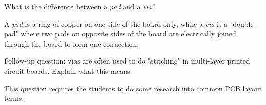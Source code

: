 

What is the difference between a {\it pad} and a {\it via}?







A {\it pad} is a ring of copper on one side of the board only, while a {\it via} is a "double-pad" where two pads on opposite sides of the board are electrically joined through the board to form one connection.

\vskip 10pt

Follow-up question: vias are often used to do "stitching" in multi-layer printed circuit boards.  Explain what this means.







This question requires the students to do some research into common PCB layout terms.




